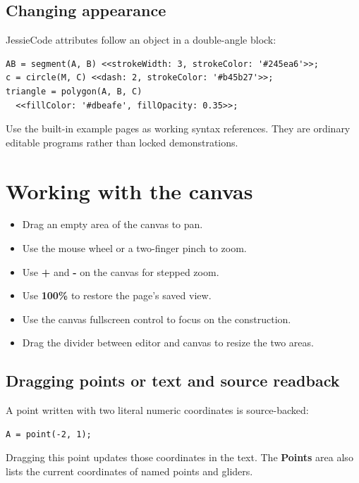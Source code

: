 \documentclass[11pt,a4paper]{article}
\newcommand{\ui}[1]{\textsf{\textbf{#1}}}
\begin{document}
\subsection{Changing appearance}

JessieCode attributes follow an object in a double-angle block:

\begin{lstlisting}[style=jessie]
AB = segment(A, B) <<strokeWidth: 3, strokeColor: '#245ea6'>>;
c = circle(M, C) <<dash: 2, strokeColor: '#b45b27'>>;
triangle = polygon(A, B, C)
  <<fillColor: '#dbeafe', fillOpacity: 0.35>>;
\end{lstlisting}

Use the built-in example pages as working syntax references. They are ordinary editable programs rather than locked demonstrations.

\section{Working with the canvas}

\begin{itemize}
  \item Drag an empty area of the canvas to pan.
  \item Use the mouse wheel or a two-finger pinch to zoom.
  \item Use \ui{+} and \ui{-} on the canvas for stepped zoom.
  \item Use \ui{100\%} to restore the page's saved view.
  \item Use the canvas fullscreen control to focus on the construction.
  \item Drag the divider between editor and canvas to resize the two areas.
\end{itemize}

\subsection{Dragging points or text and source readback}

A point written with two literal numeric coordinates is source-backed:

\begin{lstlisting}[style=jessie]
A = point(-2, 1);
\end{lstlisting}

Dragging this point updates those coordinates in the text. The \ui{Points} area also lists the current coordinates of named points and gliders.
\end{document}
